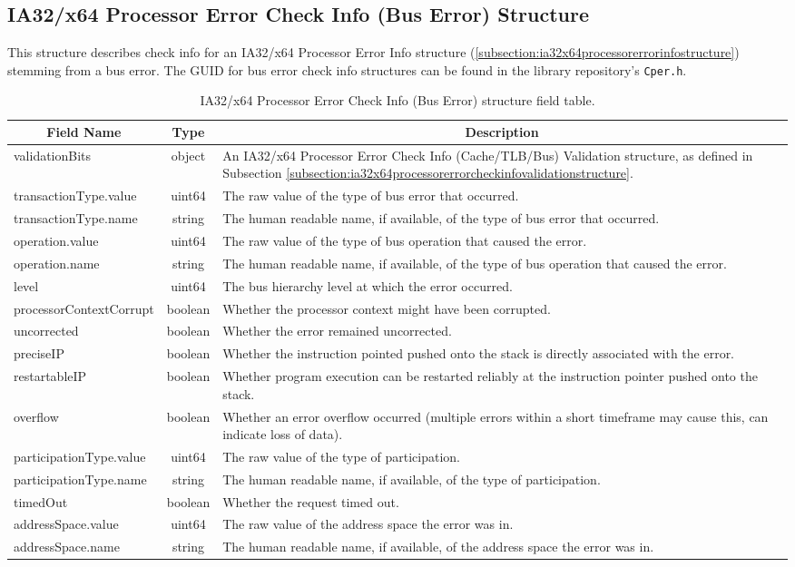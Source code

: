 \documentclass{report}
\newcommand*{\thead}[1]{\multicolumn{1}{|c|}{\bfseries #1}}
\newcommand*{\jsontable}[1]{
    \begin{table}[!ht]
    \label{#1}
    \centering
    \begin{adjustbox}{center}
    \begin{tabular}{|l|c|p{8cm}|}
    \hline
    \thead{Field Name} & \thead{Type} & \thead{Description} \\
    \hline
}
\newcommand*{\jsontableend}[1]{
    \hline
    \end{tabular}
    \end{adjustbox}
    \caption{#1}
    \label{table:#1}
    \end{table}
    \FloatBarrier
}
\begin{document}
\subsection{IA32/x64 Processor Error Check Info (Bus Error) Structure}
\label{subsection:ia32x64processorerrorcheckinfobusstructure}
This structure describes check info for an IA32/x64 Processor Error Info structure (\ref{subsection:ia32x64processorerrorinfostructure}) stemming from a bus error.
The GUID for bus error check info structures can be found in the library repository's \texttt{Cper.h}.
\jsontable{table:ia32x64processorerrorcheckinfobusstructure}
validationBits & object & An IA32/x64 Processor Error Check Info (Cache/TLB/Bus) Validation structure, as defined in Subsection \ref{subsection:ia32x64processorerrorcheckinfovalidationstructure}.\\
\hline
transactionType.value & uint64 & The raw value of the type of bus error that occurred.\\
transactionType.name & string & The human readable name, if available, of the type of bus error that occurred.\\
\hline
operation.value & uint64 & The raw value of the type of bus operation that caused the error.\\
operation.name & string & The human readable name, if available, of the type of bus operation that caused the error.\\
\hline
level & uint64 & The bus hierarchy level at which the error occurred.\\
\hline
processorContextCorrupt & boolean & Whether the processor context might have been corrupted.\\
\hline
uncorrected & boolean & Whether the error remained uncorrected.\\
\hline
preciseIP & boolean & Whether the instruction pointed pushed onto the stack is directly associated with the error.\\
\hline
restartableIP & boolean & Whether program execution can be restarted reliably at the instruction pointer pushed onto the stack.\\
\hline
overflow & boolean & Whether an error overflow occurred (multiple errors within a short timeframe may cause this, can indicate loss of data).\\
\hline
participationType.value & uint64 & The raw value of the type of participation.\\
participationType.name & string & The human readable name, if available, of the type of participation.\\
\hline
timedOut & boolean & Whether the request timed out.\\
\hline
addressSpace.value & uint64 & The raw value of the address space the error was in.\\
addressSpace.name  & string & The human readable name, if available, of the address space the error was in.\\
\jsontableend{IA32/x64 Processor Error Check Info (Bus Error) structure field table.}
\end{document}
